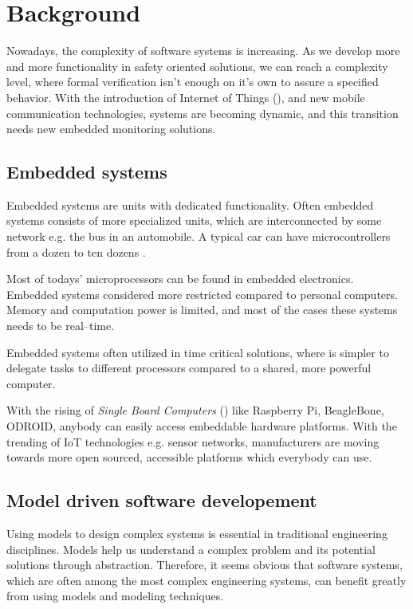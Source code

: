 
\chapter{Background}
\label{ch:background}

Nowadays, the complexity of software systems is increasing. As we develop more and more functionality in safety oriented solutions, we can reach a complexity level, where formal verification isn't enough on it's own to assure a specified behavior. With the introduction of Internet of Things (\iot), and new mobile communication technologies, systems are becoming dynamic, and this transition needs new embedded monitoring solutions.

\section{Embedded systems}

Embedded systems are units with dedicated functionality. Often embedded systems consists of more specialized units, which are interconnected by some network e.g. the  bus in an automobile. A typical car can have microcontrollers from a dozen to ten dozens \citep{VEHICLE_DYN}.

Most of todays' microprocessors can be found in embedded electronics. Embedded systems considered more restricted compared to personal computers. Memory and computation power is limited, and most of the cases these systems needs to be real--time.

Embedded systems often utilized in time critical solutions, where is simpler to delegate tasks to different processors compared to a shared, more powerful computer.

With the rising of \emph{Single Board Computers} () like Raspberry Pi, BeagleBone, ODROID, anybody can easily access embeddable hardware platforms. With the trending of IoT technologies e.g. sensor networks, manufacturers are moving towards more open sourced, accessible platforms which everybody can use.

\section{Model driven software developement}

Using models to design complex systems is essential in traditional engineering disciplines. Models help us understand a complex problem and its potential solutions through abstraction. Therefore, it seems obvious that software systems, which are often among the most complex engineering systems, can benefit greatly from using models and modeling techniques. \citep{pastor2008model}

